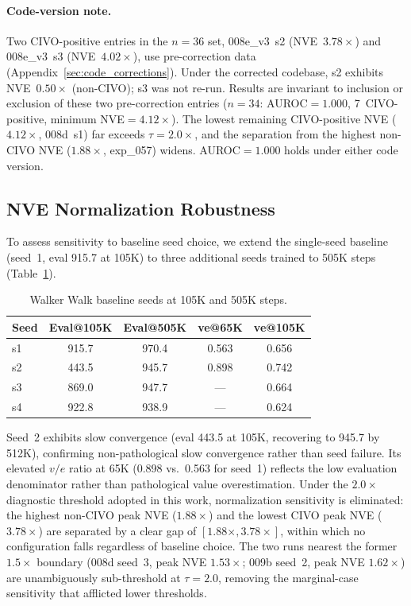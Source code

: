 \paragraph{Code-version note.}
Two CIVO-positive entries in the $n{=}36$ set, 008e\_v3~s2 (NVE~$3.78\times$) and 008e\_v3~s3 (NVE~$4.02\times$), use pre-correction data (Appendix~\ref{sec:code_corrections}). Under the corrected codebase, s2 exhibits NVE~$0.50\times$ (non-CIVO); s3 was not re-run. Results are invariant to inclusion or exclusion of these two pre-correction entries ($n{=}34$: AUROC${=}1.000$, 7~CIVO-positive, minimum NVE${=}4.12\times$). The lowest remaining CIVO-positive NVE ($4.12\times$, 008d~s1) far exceeds $\tau{=}2.0\times$, and the separation from the highest non-CIVO NVE ($1.88\times$, exp\_057) widens. AUROC${=}1.000$ holds under either code version.

\subsection{NVE Normalization Robustness}
\label{sec:nve_robustness}

To assess sensitivity to baseline seed choice, we extend the single-seed baseline (seed~1, eval 915.7 at 105K) to three additional seeds trained to 505K steps (Table~\ref{tab:baseline_seeds}).

\begin{table}[h]
\centering
\caption{Walker Walk baseline seeds at 105K and 505K steps.}
\label{tab:baseline_seeds}
\footnotesize
\begin{tabular}{lcccc}
\toprule
\textbf{Seed} & \textbf{Eval@105K} & \textbf{Eval@505K} & \textbf{ve@65K} & \textbf{ve@105K} \\
\midrule
s1 & 915.7 & 970.4 & 0.563 & 0.656 \\
s2 & 443.5 & 945.7 & 0.898 & 0.742 \\
s3 & 869.0 & 947.7 & --- & 0.664 \\
s4 & 922.8 & 938.9 & --- & 0.624 \\
\bottomrule
\end{tabular}
\end{table}

Seed~2 exhibits slow convergence (eval 443.5 at 105K, recovering to 945.7 by 512K), confirming non-pathological slow convergence rather than seed failure. Its elevated $v/e$ ratio at 65K (0.898 vs.\ 0.563 for seed~1) reflects the low evaluation denominator rather than pathological value overestimation. Under the $2.0\times$ diagnostic threshold adopted in this work, normalization sensitivity is eliminated: the highest non-CIVO peak NVE ($1.88\times$) and the lowest CIVO peak NVE ($3.78\times$) are separated by a clear gap of $[1.88\times, 3.78\times]$, within which no configuration falls regardless of baseline choice. The two runs nearest the former $1.5\times$ boundary (008d seed~3, peak NVE $1.53\times$; 009b seed~2, peak NVE $1.62\times$) are unambiguously sub-threshold at $\tau{=}2.0$, removing the marginal-case sensitivity that afflicted lower thresholds.

